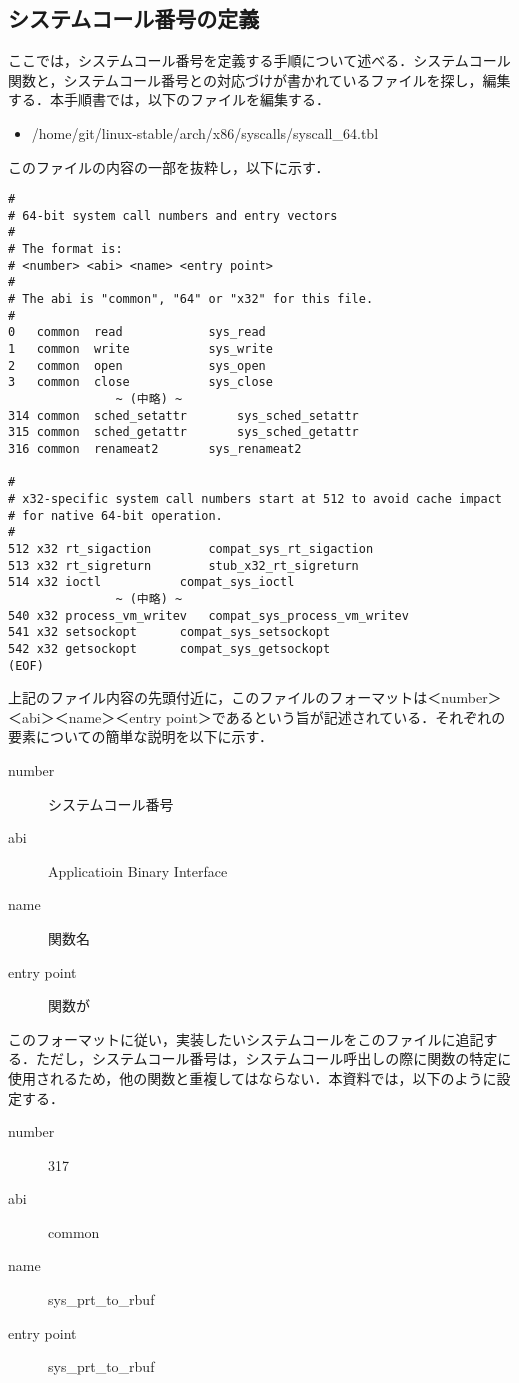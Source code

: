 \documentclass[12pt]{jsarticle}
\begin{document}
\subsection{システムコール番号の定義}
ここでは，システムコール番号を定義する手順について述べる．システムコール関数と，システムコール番号との対応づけが書かれているファイルを探し，編集する．本手順書では，以下のファイルを編集する．
\begin{itemize}
\item \slash{}home\slash{}git\slash{}linux-stable\slash{}arch\slash{}x86\slash{}syscalls\slash{}syscall\_64.tbl
\end{itemize}
このファイルの内容の一部を抜粋し，以下に示す．
\begin{verbatim}
#
# 64-bit system call numbers and entry vectors
#
# The format is:
# <number> <abi> <name> <entry point>
#
# The abi is "common", "64" or "x32" for this file.
#
0	common	read			sys_read
1	common	write			sys_write
2	common	open			sys_open
3	common	close			sys_close
               ~ (中略) ~
314	common	sched_setattr		sys_sched_setattr
315	common	sched_getattr		sys_sched_getattr
316	common	renameat2		sys_renameat2

#
# x32-specific system call numbers start at 512 to avoid cache impact
# for native 64-bit operation.
#
512	x32	rt_sigaction		compat_sys_rt_sigaction
513	x32	rt_sigreturn		stub_x32_rt_sigreturn
514	x32	ioctl			compat_sys_ioctl
               ~ (中略) ~
540	x32	process_vm_writev	compat_sys_process_vm_writev
541	x32	setsockopt		compat_sys_setsockopt
542	x32	getsockopt		compat_sys_getsockopt
(EOF)
\end{verbatim}
上記のファイル内容の先頭付近に，このファイルのフォーマットは＜number＞＜abi＞＜name＞＜entry point＞であるという旨が記述されている．それぞれの要素についての簡単な説明を以下に示す．
\begin{description}
\item[number] システムコール番号
\item[abi] Applicatioin Binary Interface
\item[name] 関数名
\item[entry point] 関数が 
\end{description}
このフォーマットに従い，実装したいシステムコールをこのファイルに追記する．ただし，システムコール番号は，システムコール呼出しの際に関数の特定に使用されるため，他の関数と重複してはならない．本資料では，以下のように設定する．
\begin{description}
\item[number] 317
\item[abi] common
\item[name] sys\_prt\_to\_rbuf
\item[entry point] sys\_prt\_to\_rbuf 
\end{description}
\end{document}
